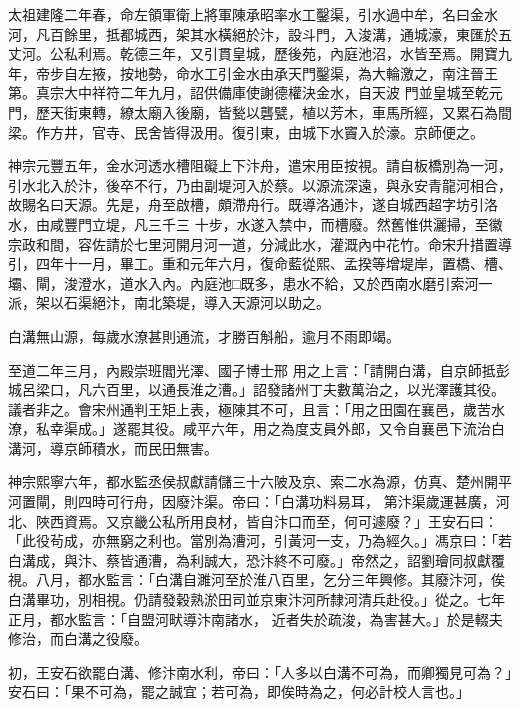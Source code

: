 \begin{pinyinscope}
 太祖建隆二年春，命左領軍衛上將軍陳承昭率水工鑿渠，引水過中牟，名曰金水河，凡百餘里，抵都城西，架其水橫絕於汴，設斗門，入浚溝，通城濠，東匯於五丈河。公私利焉。乾德三年，又引貫皇城，歷後苑，內庭池沼，水皆至焉。開寶九年，帝步自左掖，按地勢，命水工引金水由承天門鑿渠，為大輪激之，南注晉王第。真宗大中祥符二年九月，詔供備庫使謝德權決金水，自天波
 門並皇城至乾元門，歷天街東轉，繚太廟入後廟，皆甃以礱甓，植以芳木，車馬所經，又累石為間梁。作方井，官寺、民舍皆得汲用。復引東，由城下水竇入於濠。京師便之。



 神宗元豐五年，金水河透水槽阻礙上下汴舟，遣宋用臣按視。請自板橋別為一河，引水北入於汴，後卒不行，乃由副堤河入於蔡。以源流深遠，與永安青龍河相合，故賜名曰天源。先是，舟至啟槽，頗滯舟行。既導洛通汴，遂自城西超字坊引洛水，由咸豐門立堤，凡三千三
 十步，水遂入禁中，而槽廢。然舊惟供灑掃，至徽宗政和間，容佐請於七里河開月河一道，分減此水，灌溉內中花竹。命宋升措置導引，四年十一月，畢工。重和元年六月，復命藍從熙、孟揆等增堤岸，置橋、槽、壩、閘，浚澄水，道水入內。內庭池□既多，患水不給，又於西南水磨引索河一派，架以石渠絕汴，南北築堤，導入天源河以助之。



 白溝無山源，每歲水潦甚則通流，才勝百斛船，逾月不雨即竭。



 至道二年三月，內殿崇班閻光澤、國子博士邢
 用之上言：「請開白溝，自京師抵彭城呂梁口，凡六百里，以通長淮之漕。」詔發諸州丁夫數萬治之，以光澤護其役。議者非之。會宋州通判王矩上表，極陳其不可，且言：「用之田園在襄邑，歲苦水潦，私幸渠成。」遂罷其役。咸平六年，用之為度支員外郎，又令自襄邑下流治白溝河，導京師積水，而民田無害。



 神宗熙寧六年，都水監丞侯叔獻請儲三十六陂及京、索二水為源，仿真、楚州開平河置閘，則四時可行舟，因廢汴渠。帝曰：「白溝功料易耳，
 第汴渠歲運甚廣，河北、陜西資焉。又京畿公私所用良材，皆自汴口而至，何可遽廢？」王安石曰：「此役茍成，亦無窮之利也。當別為漕河，引黃河一支，乃為經久。」馮京曰：「若白溝成，與汴、蔡皆通漕，為利誠大，恐汴終不可廢。」帝然之，詔劉璯同叔獻覆視。八月，都水監言：「白溝自濉河至於淮八百里，乞分三年興修。其廢汴河，俟白溝畢功，別相視。仍請發穀熟淤田司並京東汴河所隸河清兵赴役。」從之。七年正月，都水監言：「自盟河畎導汴南諸水，
 近者失於疏浚，為害甚大。」於是輟夫修治，而白溝之役廢。



 初，王安石欲罷白溝、修汴南水利，帝曰：「人多以白溝不可為，而卿獨見可為？」安石曰：「果不可為，罷之誠宜；若可為，即俟時為之，何必計校人言也。」




\end{pinyinscope}
